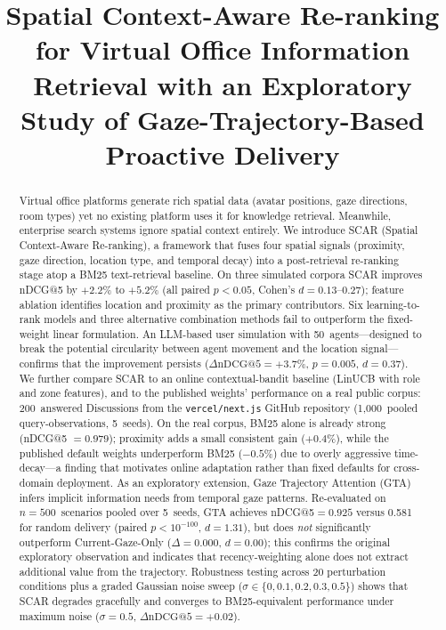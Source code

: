 \documentclass[journal]{IEEEtran}
\title{Spatial Context-Aware Re-ranking for Virtual Office
       Information Retrieval with an Exploratory Study of
       Gaze-Trajectory-Based Proactive Delivery}
\author{
\IEEEauthorblockN{Ryota Nakamura}


\IEEEauthorblockA{
Faculty of Data Science, Musashino University, Asia AI Institute, Tokyo, Japan\\
ryota.nakamura@ds.musashino-u.ac.jp
}
}
\begin{document}
\maketitle

\begin{abstract}
Virtual office platforms generate rich spatial data (avatar positions, gaze
directions, room types) yet no existing platform uses it for knowledge
retrieval. Meanwhile, enterprise search systems ignore spatial context
entirely. We introduce SCAR (Spatial Context-Aware Re-ranking), a framework
that fuses four spatial signals (proximity, gaze direction, location type, and
temporal decay) into a post-retrieval re-ranking stage atop a BM25
text-retrieval baseline. On three simulated corpora SCAR improves nDCG@5 by
$+2.2\%$ to $+5.2\%$ (all paired $p < 0.05$, Cohen's $d = 0.13$--$0.27$);
feature ablation identifies location and proximity as the primary
contributors. Six learning-to-rank models and three alternative combination
methods fail to outperform the fixed-weight linear formulation. An LLM-based
user simulation with 50~agents---designed to break the potential circularity
between agent movement and the location signal---confirms that the
improvement persists ($\Delta\text{nDCG@5} = +3.7\%$, $p = 0.005$, $d = 0.37$).
We further compare SCAR to an online contextual-bandit baseline (LinUCB with
role and zone features), and to the published weights' performance on a real
public corpus: 200~answered Discussions from the \texttt{vercel/next.js}
GitHub repository (1{,}000~pooled query-observations, 5~seeds). On the real
corpus, BM25 alone is already strong (nDCG@5 $= 0.979$); proximity adds a
small consistent gain ($+0.4\%$), while the published default weights
underperform BM25 ($-0.5\%$) due to overly aggressive time-decay---a finding
that motivates online adaptation rather than fixed defaults for cross-domain
deployment.
As an exploratory extension, Gaze Trajectory Attention (GTA) infers implicit
information needs from temporal gaze patterns. Re-evaluated on
$n{=}500$~scenarios pooled over 5~seeds, GTA achieves nDCG@5${=}0.925$ versus
0.581 for random delivery (paired $p{<}10^{-100}$, $d = 1.31$), but does
\emph{not} significantly outperform Current-Gaze-Only ($\Delta = 0.000$,
$d = 0.00$); this confirms the original exploratory observation and indicates
that recency-weighting alone does not extract additional value from the
trajectory.
Robustness testing across 20 perturbation conditions plus a graded Gaussian
noise sweep ($\sigma \in \{0, 0.1, 0.2, 0.3, 0.5\}$) shows that SCAR degrades
gracefully and converges to BM25-equivalent performance under maximum noise
($\sigma{=}0.5$, $\Delta\text{nDCG@5} = +0.02$).
\end{abstract}
\end{document}
